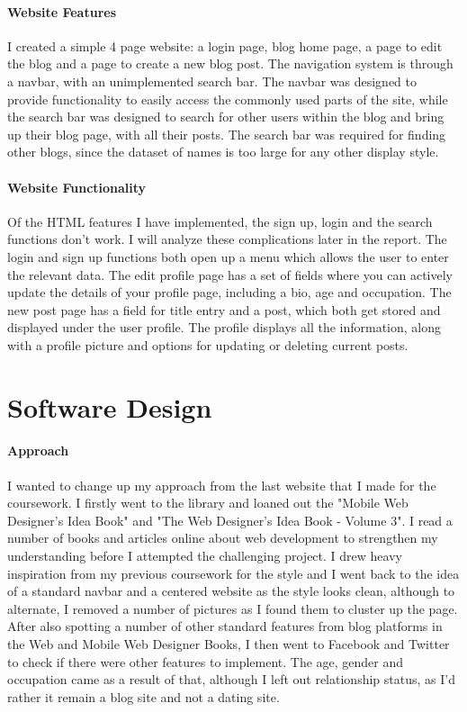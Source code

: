 \documentclass[10pt, a4paper]{article}
\begin{document}
	\paragraph{Website Features}
I created a simple 4 page website: a login page, blog home page, a page to edit the blog and a page to create a new blog post.
The navigation system is through a navbar, with an unimplemented search bar. The navbar was designed to provide functionality to easily access the commonly used parts of the site, while the search bar was designed to search for other users within the blog and bring up their blog page, with all their posts. The search bar was required for finding other blogs, since the dataset of names is too large for any other display style.

	\paragraph{Website Functionality}
Of the HTML features I have implemented, the sign up, login and the search functions don't work. I will analyze these complications later in the report. The login and sign up functions both open up a menu which allows the user to enter the relevant data. The edit profile page has a set of fields where you can actively update the details of your profile page, including a bio, age and occupation. The new post page has a field for title entry and a post, which both get stored and displayed under the user profile. The profile displays all the information, along with a profile picture and options for updating or deleting current posts.

    	\section{Software Design}
    	\paragraph{Approach}
I wanted to change up my approach from the last website that I made for the coursework. I firstly went to the library and loaned out the "Mobile Web Designer's Idea Book" and "The Web Designer's Idea Book - Volume 3". I read a number of books and articles online about web development to strengthen my understanding before I attempted the challenging project. I drew heavy inspiration from my previous coursework for the style and I went back to the idea of a standard navbar and a centered website as the style looks clean, although to alternate, I removed a number of pictures as I found them to cluster up the page. After also spotting a number of other standard features from blog platforms in the Web and Mobile Web Designer Books, I then went to Facebook and Twitter to check if there were other features to implement. The age, gender and occupation came as a result of that, although I left out relationship status, as I'd rather it remain a blog site and not a dating site.
\end{document}
